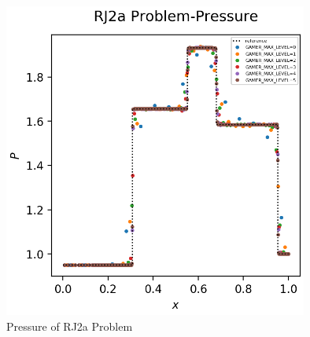 \documentclass[a4paper,10pt]{article}
\begin{document}
\begin{figure}[htbp] %
\centering %
\includegraphics[width=10cm]{pressure_2.png} %
\caption{Pressure of RJ2a Problem}
\end{figure}
\end{document}
